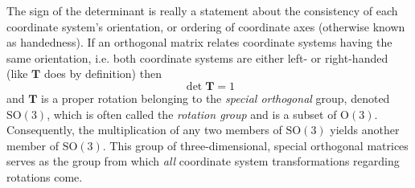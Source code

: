 \documentclass[11pt,dvipsnames]{thesis}
\begin{document}
The sign of the determinant is really a statement about the consistency of each coordinate system's orientation, or ordering of coordinate axes (otherwise known as handedness). If an orthogonal matrix relates coordinate systems having the same orientation, i.e. both coordinate systems are either left- or right-handed (like $\mathbf{T}$ does by definition) then
\begin{equation}
\det\mathbf{T} = 1
\end{equation}
and $\mathbf{T}$ is a proper rotation belonging to the \textit{special orthogonal} group, denoted $\mathrm{SO}(3)$, which is often called the \textit{rotation group} and is a subset of $\mathrm{O}(3)$. Consequently, the multiplication of any two members of $\mathrm{SO}(3)$ yields another member of $\mathrm{SO}(3)$. This group of three-dimensional, special orthogonal matrices serves as the group from which \textit{all} coordinate system transformations regarding rotations come.
\end{document}
